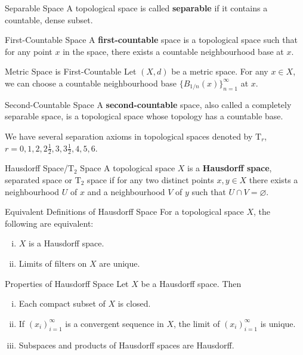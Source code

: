 \documentclass{report}
\begin{document}
\begin{definition}{Separable Space}{}
	A topological space is called \textbf{separable} if it contains a countable, dense subset.
\end{definition}


\begin{definition}{First-Countable Space}{}
	A \textbf{first-countable} space is a topological space such that for any point $x$ in the space, there exists a countable neighbourhood base at $x$.
\end{definition}

\begin{example}{Metric Space is First-Countable}{}
	Let $(X,d)$ be a metric space. For any $x\in X$, we can choose a countable neighbourhood base $\{B_{1/n}(x)\}_{n=1}^\infty$ at $x$.
\end{example}

\begin{definition}{Second-Countable Space}{}
	A \textbf{second-countable} space, also called a completely separable space, is a topological space whose topology has a countable base.
\end{definition}


We have several separation axioms in topological spaces denoted by $\mathrm{T}_r$, $r=0,1,2,2\frac{1}{2},3,3\frac{1}{2},4,5,6$.
\begin{definition}{Hausdorff Space/$\mathrm{T}_2$ Space}{}
	A topological space $X$ is a \textbf{Hausdorff space}, separated space or $\mathrm{T}_2$ space if for any two distinct points $x,y\in X$ there exists a neighbourhood $U$ of $x$ and a neighbourhood $V$ of $y$ such that $U\cap V=\varnothing$.
\end{definition}

\begin{proposition}{Equivalent Definitions of Hausdorff Space}{}
	For a topological space $X$, the following are equivalent:
	\begin{enumerate}[(i)]
		\item $X$ is a Hausdorff space.
		\item Limits of filters on $X$ are unique.
	\end{enumerate}
\end{proposition}
 
\begin{proposition}{Properties of Hausdorff Space}{}
	Let $X$ be a Hausdorff space. Then
	\begin{enumerate}[(i)]
		\item Each compact subset of $X$ is closed.
		\item If $(x_i)_{i=1}^{\infty}$ is a convergent sequence in $X$, the limit of $(x_i)_{i=1}^{\infty}$ is unique.
		\item Subspaces and products of Hausdorff spaces are Hausdorff.
	\end{enumerate}
\end{proposition}
\end{document}
